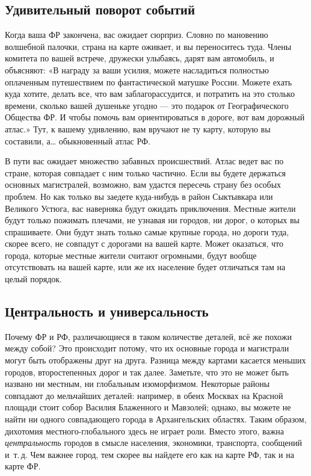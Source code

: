 \documentclass[../main.tex]{subfiles}
\begin{document}
\subsection{Удивительный поворот событий}

Когда ваша ФР закончена, вас ожидает сюрприз. Словно по мановению волшебной палочки, страна на карте оживает, и вы переноситесь туда. Члены комитета по вашей встрече, дружески улыбаясь, дарят вам автомобиль, и объясняют: «В награду за ваши усилия, можете насладиться полностью оплаченным путешествием по фантастической матушке России. Можете ехать куда хотите, делать все, что вам заблагорассудится, и потратить на это столько времени, сколько вашей душеньке угодно --- это подарок от Географического Общества ФР\@. И чтобы помочь вам ориентироваться в дороге, вот вам дорожный атлас.» Тут, к вашему удивлению, вам вручают не ту карту, которую вы составили, а\ldots{} обыкновенный атлас РФ.

В пути вас ожидает множество забавных происшествий. Атлас ведет вас по стране, которая совпадает с ним только частично. Если вы будете держаться основных магистралей, возможно, вам удастся пересечь страну без особых проблем. Но как только вы заедете куда-нибудь в район Сыктывкара или Великого Устюга, вас наверняка будут ожидать приключения. Местные жители будут только пожимать плечами, не узнавая ни городов, ни дорог, о которых вы спрашиваете. Они будут знать только самые крупные города, но дороги туда, скорее всего, не совпадут с дорогами на вашей карте. Может оказаться, что города, которые местные жители считают огромными, будут вообще отсутствовать на вашей карте, или же их население будет отличаться там на целый порядок.


\subsection{Центральность и универсальность}

Почему ФР и РФ, различающиеся в таком количестве деталей, всё же похожи между собой? Это происходит потому, что их основные города и магистрали могут быть отображены друг на друга. Разница между картами касается меньших городов, второстепенных дорог и так далее. Заметьте, что это не может быть названо ни местным, ни глобальным изоморфизмом. Некоторые районы совпадают до мельчайших деталей: например, в обеих Москвах на Красной площади стоит собор Василия Блаженного и Мавзолей; однако, вы можете не найти ни одного совпадающего города в Архангельских областях. Таким образом, дихотомия местного-глобального здесь не играет роли. Вместо этого, важна \emph{центральность} городов в смысле населения, экономики, транспорта, сообщений и~т.\,д. Чем важнее город, тем скорее вы найдете его как на карте РФ, так и на карте ФР.
\end{document}
